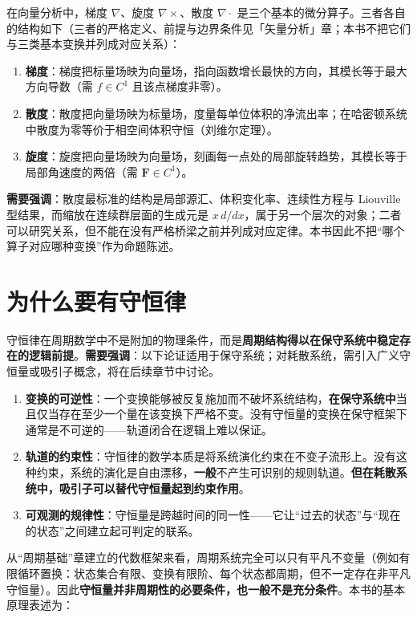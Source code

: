 在向量分析中，梯度 $\nabla$、旋度 $\nabla\times$、散度 $\nabla\cdot$ 是三个基本的微分算子。三者各自的结构如下（三者的严格定义、前提与边界条件见「矢量分析」章；本书不把它们与三类基本变换并列成对应关系）：

\begin{enumerate}[leftmargin=4em, label={(\arabic*)}]
    \item \textbf{梯度}：梯度把标量场映为向量场，指向函数增长最快的方向，其模长等于最大方向导数（需 $f \in C^1$ 且该点梯度非零）。
    \item \textbf{散度}：散度把向量场映为标量场，度量每单位体积的净流出率；在哈密顿系统中散度为零等价于相空间体积守恒（刘维尔定理）。
    \item \textbf{旋度}：旋度把向量场映为向量场，刻画每一点处的局部旋转趋势，其模长等于局部角速度的两倍（需 $\mathbf{F} \in C^1$）。
\end{enumerate}

\textbf{需要强调}：散度最标准的结构是局部源汇、体积变化率、连续性方程与 Liouville 型结果，而缩放在连续群层面的生成元是 $x\,d/dx$，属于另一个层次的对象；二者可以研究关系，但不能在没有严格桥梁之前并列成对应定律。本书因此不把“哪个算子对应哪种变换”作为命题陈述。

\section*{为什么要有守恒律}

守恒律在周期数学中不是附加的物理条件，而是\textbf{周期结构得以在保守系统中稳定存在的逻辑前提}。\textbf{需要强调}：以下论证适用于保守系统；对耗散系统，需引入广义守恒量或吸引子概念，将在后续章节中讨论。

\begin{enumerate}[label=(\roman*)]
    \item \textbf{变换的可逆性}：一个变换能够被反复施加而不破坏系统结构，\textbf{在保守系统中}当且仅当存在至少一个量在该变换下严格不变。没有守恒量的变换在保守框架下通常是不可逆的——轨道闭合在逻辑上难以保证。
    \item \textbf{轨道的约束性}：守恒律的数学本质是将系统演化约束在不变子流形上。没有这种约束，系统的演化是自由漂移，\textbf{一般}不产生可识别的规则轨道。\textbf{但在耗散系统中，吸引子可以替代守恒量起到约束作用}。
    \item \textbf{可观测的规律性}：守恒量是跨越时间的同一性——它让“过去的状态”与“现在的状态”之间建立起可判定的联系。
\end{enumerate}

从“周期基础”章建立的代数框架来看，周期系统完全可以只有平凡不变量（例如有限循环置换：状态集合有限、变换有限阶、每个状态都周期，但不一定存在非平凡守恒量）。因此\textbf{守恒量并非周期性的必要条件，也一般不是充分条件}。本书的基本原理表述为：

